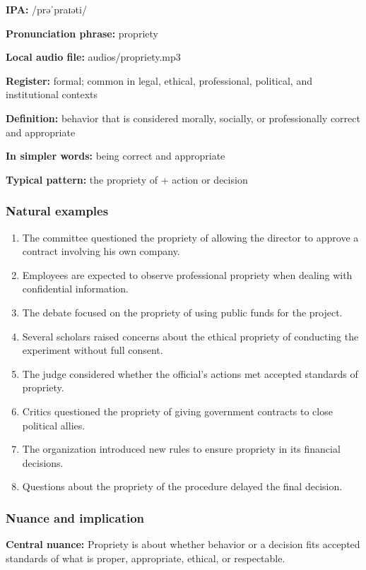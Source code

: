 \documentclass[11pt]{article}
\begin{document}
\textbf{IPA:} /prəˈpraɪəti/

\textbf{Pronunciation phrase:} propriety

\textbf{Local audio file:} audios/propriety.mp3

\textbf{Register:} formal; common in legal, ethical, professional, political, and institutional contexts

\textbf{Definition:} behavior that is considered morally, socially, or professionally correct and appropriate

\textbf{In simpler words:} being correct and appropriate

\textbf{Typical pattern:} the propriety of + action or decision

\subsubsection{Natural examples}
\begin{enumerate}
  \item The committee questioned the propriety of allowing the director to approve a contract involving his own company.
  \item Employees are expected to observe professional propriety when dealing with confidential information.
  \item The debate focused on the propriety of using public funds for the project.
  \item Several scholars raised concerns about the ethical propriety of conducting the experiment without full consent.
  \item The judge considered whether the official's actions met accepted standards of propriety.
  \item Critics questioned the propriety of giving government contracts to close political allies.
  \item The organization introduced new rules to ensure propriety in its financial decisions.
  \item Questions about the propriety of the procedure delayed the final decision.
\end{enumerate}

\subsubsection{Nuance and implication}
\textbf{Central nuance:} Propriety is about whether behavior or a decision fits accepted standards of what is proper, appropriate, ethical, or respectable.
\end{document}

